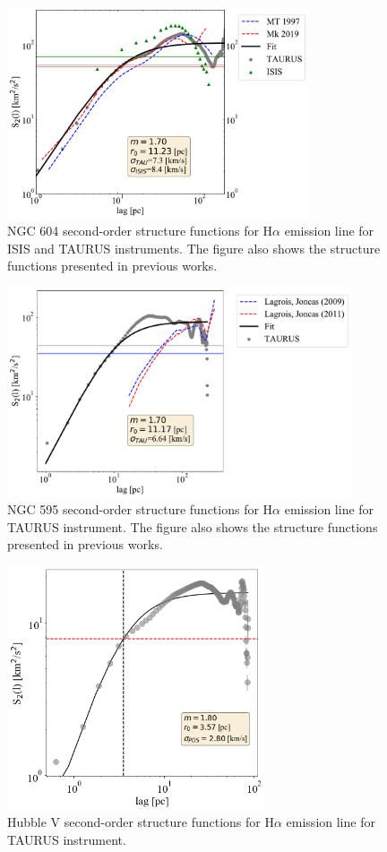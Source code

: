 \documentclass[fleqn,usenatbib]{mnras}
\begin{document}
\begin{figure}
\centering 
\includegraphics[width=3.5in]{Figures/SF604.pdf}
\caption{NGC 604 second-order structure functions for H$\alpha$ emission line for ISIS and TAURUS instruments. The figure also shows the structure functions presented in previous works.}
\label{fig:SF604}
\end{figure}

\begin{figure}
\centering 
\includegraphics[width=4in]{Figures/SF595.pdf}
\caption{NGC 595 second-order structure functions for H$\alpha$ emission line for TAURUS instrument. The figure also shows the structure functions presented in previous works.}
\label{fig:SF595}
\end{figure}

\begin{figure}
\centering 
\includegraphics[width=3in]{Figures/HV}
\caption{Hubble V second-order structure functions for H$\alpha$ emission line for TAURUS instrument.}
\label{fig:SFV}
\end{figure}
\end{document}
